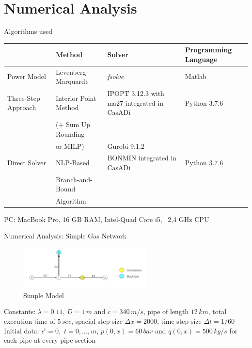\documentclass[8pt]{beamer}
\newcommand\Fontli{\fontsize{7}{7.2}\selectfont}
\begin{document}
\section{Numerical Analysis}
\begin{frame}{Algorithms used}
\Fontli
\begin{tabular}{ ll m{2.7cm} m{2cm}}\toprule
 & \textcolor{bluepurp}{Method} & \textcolor{bluepurp}{Solver} & \textcolor{bluepurp}{Programming Language}\\
 \hline
 \rule{0pt}{3ex}
Power Model & Levenberg-Marquardt & \textit{fsolve} & Matlab\\
\rule{0pt}{5ex}
Three-Step Approach & Interior Point Method & IPOPT 3.12.3 with ma27 integrated in CasADi& Python 3.7.6\\
& ($+$ Sum Up Rounding  & & \\
& or MILP) & Gurobi 9.1.2 & \\ \rule{0pt}{5ex}
Direct Solver & NLP-Based& BONMIN integrated in CasADi & Python 3.7.6\\
& Branch-and-Bound &  & \\
& Algorithm &  & \\
\bottomrule
\end{tabular}
\newline\newline\newline\newline
\textcolor{bluepurp}{PC}: MacBook Pro,  16 GB RAM, Intel-Quad Core i5, \, 2,4 GHz CPU
\end{frame}

\begin{frame}{Numerical Analysis: Simple Gas Network}
\begin{figure}[l]
\centering
\includegraphics[width=0.6\textwidth]{images/SimpleNetwork}
\caption{Simple Model}
\label{PowerGrid}
\end{figure}
\textcolor{bluepurp}{Constants:} $\lambda = 0.11$, $D=1 \, m$ and $c = 340 \, m/s$,  pipe of length $12 \, km$,  total execution time of $5 \, sec$,  spacial step size  $\Delta x = 2000$,  time step size $\Delta t = 1/60$ \newline\newline
\textcolor{bluepurp}{Initial data:} $\epsilon^t=0,$ $t=0,...,m$,  $p(0,x)= 60 \, bar$ and $q(0,x) = 500 \, kg/s$ for each pipe at every pipe section
\end{frame}
\end{document}
